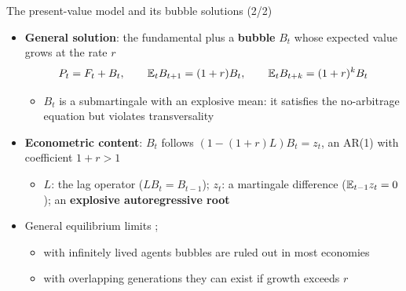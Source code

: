 \begin{frame}{The present-value model and its bubble solutions (2/2)}
\itemsize{\small}
\begin{itemize}
    \item \textbf{General solution}: the fundamental plus a \textbf{bubble} $B_t$ whose expected value grows at the rate $r$ \[ P_t = F_t + B_t, \qquad \mathbb{E}_t B_{t+1} = (1 + r)B_t, \qquad \mathbb{E}_t B_{t+k} = (1 + r)^k B_t \]
    \begin{itemize}
        \item $B_t$ is a submartingale with an explosive mean: it satisfies the no-arbitrage equation but violates transversality
    \end{itemize}
    \item \textbf{Econometric content}: $B_t$ follows $(1 - (1 + r)L)B_t = z_t$, an AR(1) with coefficient $1 + r > 1$
    \begin{itemize}
        \item $L$: the lag operator ($LB_t = B_{t-1}$); $z_t$: a martingale difference ($\mathbb{E}_{t-1}z_t = 0$); an \textbf{explosive autoregressive root}
    \end{itemize}
    \item General equilibrium limits ; 
    \begin{itemize}
        \item with infinitely lived agents bubbles are ruled out in most economies
        \item with overlapping generations they can exist if growth exceeds $r$
    \end{itemize}
\end{itemize}
\end{frame}

